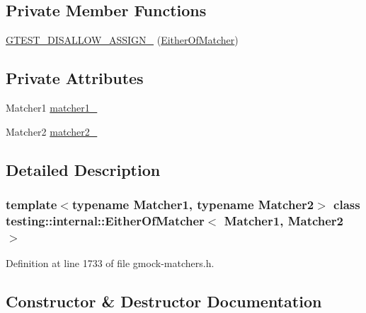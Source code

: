 \subsection*{Private Member Functions}
\begin{DoxyCompactItemize}
\item 
\hyperlink{classtesting_1_1internal_1_1EitherOfMatcher_ae9309360587fde1e8dee4ed4a1bfebd3}{G\+T\+E\+S\+T\+\_\+\+D\+I\+S\+A\+L\+L\+O\+W\+\_\+\+A\+S\+S\+I\+G\+N\+\_\+} (\hyperlink{classtesting_1_1internal_1_1EitherOfMatcher}{Either\+Of\+Matcher})
\end{DoxyCompactItemize}
\subsection*{Private Attributes}
\begin{DoxyCompactItemize}
\item 
Matcher1 \hyperlink{classtesting_1_1internal_1_1EitherOfMatcher_a335b19a187644e6057f0046a2e6949cf}{matcher1\+\_\+}
\item 
Matcher2 \hyperlink{classtesting_1_1internal_1_1EitherOfMatcher_a4c8a80860b5748dfb764744a8aae6a90}{matcher2\+\_\+}
\end{DoxyCompactItemize}


\subsection{Detailed Description}
\subsubsection*{template$<$typename Matcher1, typename Matcher2$>$\newline
class testing\+::internal\+::\+Either\+Of\+Matcher$<$ Matcher1, Matcher2 $>$}



Definition at line 1733 of file gmock-\/matchers.\+h.



\subsection{Constructor \& Destructor Documentation}
\mbox{\label{classtesting_1_1internal_1_1EitherOfMatcher_a5ae2361f20a0460870b72b83fcc0c643}} 

